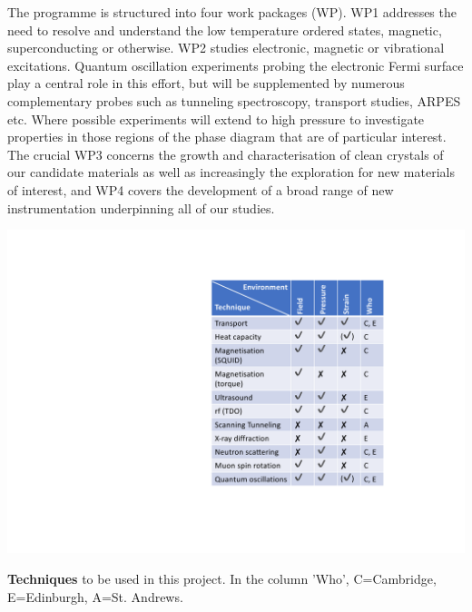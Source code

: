 The programme is structured into four work packages (WP). WP1 addresses the need to resolve and understand the low temperature ordered states, magnetic, superconducting or otherwise. WP2 studies electronic, magnetic or vibrational excitations. Quantum oscillation experiments probing the electronic Fermi surface play a central role in this effort, but will be supplemented by numerous complementary probes such as tunneling spectroscopy, transport studies, ARPES etc. Where possible experiments will extend to high pressure to investigate properties in those regions of the phase diagram that are of particular interest. The crucial WP3 concerns the growth and characterisation of clean crystals of our candidate materials as well as increasingly the exploration for new materials of interest, and WP4 covers the development of a broad range of new instrumentation underpinning all of our studies. 


\begin{table}
  \centerline{\includegraphics[width=0.7\columnwidth]{Figures/MethodsTable.pdf}}
  \caption{{\bf Techniques} to be used in this project. In the column 'Who', C=Cambridge, E=Edinburgh, A=St. Andrews.}
  \label{tab:Methods}
\end{table}


